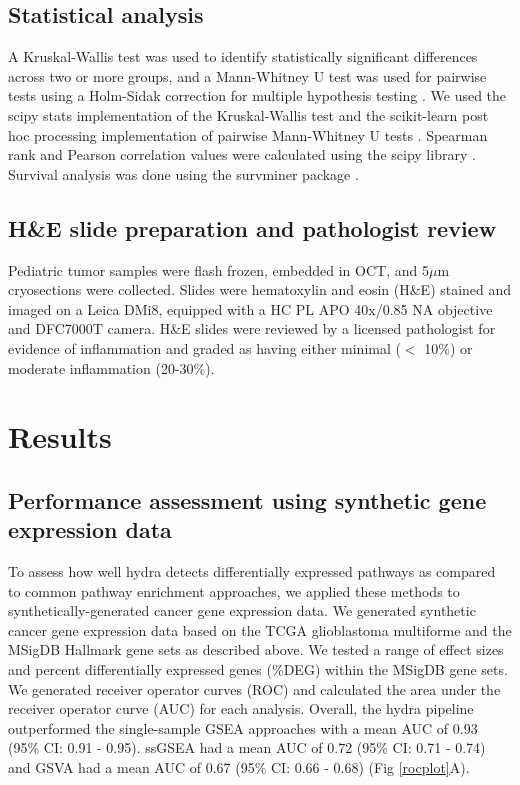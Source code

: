 \documentclass[10pt,letterpaper]{article}
\begin{document}
\subsection*{Statistical analysis}
A Kruskal-Wallis test was used to identify statistically significant differences across two or more groups, and a Mann-Whitney U test was used for pairwise tests using a Holm-Sidak correction for multiple hypothesis testing \cite{pedregosa2011scikit,jonesSciPyOpenSource2001}. We used the scipy \cite{2019arXiv190710121V} stats implementation of the Kruskal-Wallis test and the scikit-learn post hoc processing \cite{Terpilowski2019} implementation of pairwise Mann-Whitney U tests . Spearman rank and Pearson correlation values were calculated using the scipy library \cite{jonesSciPyOpenSource2001}. Survival analysis was done using the survminer package \cite{kassambaraSurvminerDrawingSurvival2019}. 

\subsection*{H\&E slide preparation and pathologist review}
Pediatric tumor samples were flash frozen, embedded in OCT, and 5$\mu$m cryosections were collected. Slides were hematoxylin and eosin (H\&E) stained and imaged on a Leica DMi8, equipped with a HC PL APO 40x/0.85 NA objective and DFC7000T camera. H\&E slides were reviewed by a licensed pathologist for evidence of inflammation and graded as having either minimal ($<$ 10\%) or moderate inflammation (20-30\%).

\section*{Results}
\subsection*{Performance assessment using synthetic gene expression data}
To assess how well hydra detects differentially expressed pathways as compared to common pathway enrichment approaches, we applied these methods to synthetically-generated cancer gene expression data. We generated synthetic cancer gene expression data based on the TCGA glioblastoma multiforme and the MSigDB Hallmark gene sets as described above. We tested a range of effect sizes and percent differentially expressed genes (\%DEG) within the MSigDB gene sets. We generated receiver operator curves (ROC) and calculated the area under the receiver operator curve (AUC) for each analysis. Overall, the hydra pipeline outperformed the single-sample GSEA approaches with a mean AUC of 0.93 (95\% CI: 0.91 - 0.95). ssGSEA had a mean AUC of 0.72 (95\% CI: 0.71 - 0.74) and GSVA had a mean AUC of 0.67 (95\% CI: 0.66 - 0.68) (Fig \ref{rocplot}A).
\end{document}
